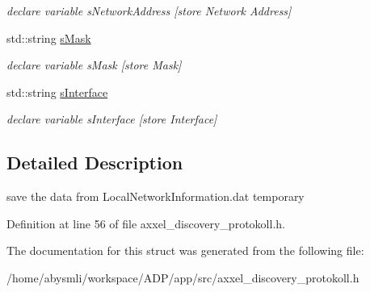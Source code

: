 \begin{DoxyCompactItemize}
\begin{DoxyCompactList}\small\item\em declare variable s\-Network\-Address \mbox{[}store Network Address\mbox{]} \end{DoxyCompactList}\item 
\hypertarget{structstRoutetable_a14f14d5a55c22279a8cfb7452c6e1148}{std\-::string \hyperlink{structstRoutetable_a14f14d5a55c22279a8cfb7452c6e1148}{s\-Mask}}\label{structstRoutetable_a14f14d5a55c22279a8cfb7452c6e1148}

\begin{DoxyCompactList}\small\item\em declare variable s\-Mask \mbox{[}store Mask\mbox{]} \end{DoxyCompactList}\item 
\hypertarget{structstRoutetable_a02604c87af267a30c992c3c8f8e8366a}{std\-::string \hyperlink{structstRoutetable_a02604c87af267a30c992c3c8f8e8366a}{s\-Interface}}\label{structstRoutetable_a02604c87af267a30c992c3c8f8e8366a}

\begin{DoxyCompactList}\small\item\em declare variable s\-Interface \mbox{[}store Interface\mbox{]} \end{DoxyCompactList}\end{DoxyCompactItemize}


\subsection{Detailed Description}
save the data from Local\-Network\-Information.\-dat temporary 

Definition at line 56 of file axxel\-\_\-discovery\-\_\-protokoll.\-h.



The documentation for this struct was generated from the following file\-:\begin{DoxyCompactItemize}
\item 
/home/abysmli/workspace/\-A\-D\-P/app/src/axxel\-\_\-discovery\-\_\-protokoll.\-h\end{DoxyCompactItemize}

